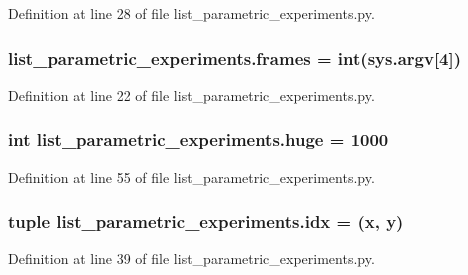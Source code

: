 Definition at line 28 of file list\+\_\+parametric\+\_\+experiments.\+py.

\subsubsection[{\texorpdfstring{frames}{frames}}]{\setlength{\rightskip}{0pt plus 5cm}list\+\_\+parametric\+\_\+experiments.\+frames = int(sys.\+argv\mbox{[}4\mbox{]})}\hypertarget{namespacelist__parametric__experiments_a56035b638d3ae7d9452dedd7b3c3ae6c}{}\label{namespacelist__parametric__experiments_a56035b638d3ae7d9452dedd7b3c3ae6c}


Definition at line 22 of file list\+\_\+parametric\+\_\+experiments.\+py.

\subsubsection[{\texorpdfstring{huge}{huge}}]{\setlength{\rightskip}{0pt plus 5cm}int list\+\_\+parametric\+\_\+experiments.\+huge = 1000}\hypertarget{namespacelist__parametric__experiments_add96fbacbf85889ca4dedb056c82b646}{}\label{namespacelist__parametric__experiments_add96fbacbf85889ca4dedb056c82b646}


Definition at line 55 of file list\+\_\+parametric\+\_\+experiments.\+py.

\subsubsection[{\texorpdfstring{idx}{idx}}]{\setlength{\rightskip}{0pt plus 5cm}tuple list\+\_\+parametric\+\_\+experiments.\+idx = ({\bf x}, {\bf y})}\hypertarget{namespacelist__parametric__experiments_a7be0c13aa83d4467550916592b229540}{}\label{namespacelist__parametric__experiments_a7be0c13aa83d4467550916592b229540}


Definition at line 39 of file list\+\_\+parametric\+\_\+experiments.\+py.

